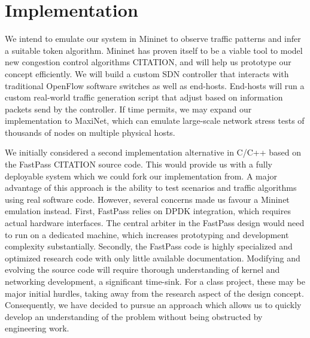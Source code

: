 \section{Implementation}
\label{sec:implementation}
We intend to emulate our system in Mininet to observe traffic patterns and infer a suitable token algorithm. Mininet has proven itself to be a viable tool to model new congestion control algorithms CITATION, and will help us prototype our concept efficiently. We will build a custom SDN controller that interacts with traditional OpenFlow software switches as well as end-hosts. End-hosts will run a custom real-world traffic generation script that adjust based on information packets send by the controller. 
If time permits, we may expand our implementation to MaxiNet, which can emulate large-scale network stress tests of thousands of nodes on multiple physical hosts.

We initially considered a second implementation alternative in C/C++ based on the FastPass  CITATION source code. This would provide us with a fully deployable system which we could fork our implementation from. A major advantage of this approach is the ability to test scenarios and traffic algorithms using real software code. 
However, several concerns made us favour a Mininet emulation instead.
First, FastPass relies on DPDK integration, which requires actual hardware interfaces. The central arbiter in the FastPass design would need to run on a dedicated machine, which increases prototyping and development complexity substantially.
Secondly, the FastPass code is highly specialized and optimized research code with only little available documentation. Modifying and evolving the source code will require thorough understanding of kernel and networking development, a significant time-sink. For a class project, these may be major initial hurdles, taking away from the research aspect of the design concept.
Consequently, we have decided to pursue an approach which allows us to quickly develop an understanding of the problem without being obstructed by engineering work.
